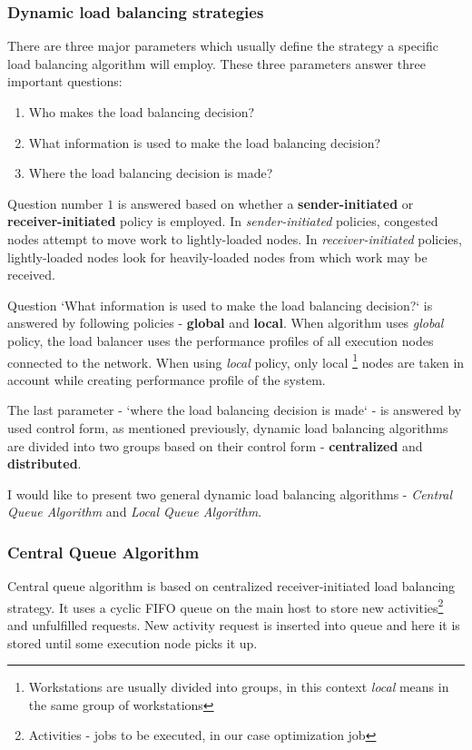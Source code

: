 \subsubsection{Dynamic load balancing strategies}
There are three major parameters which usually define the strategy a specific load balancing algorithm will employ.
These three parameters answer three important questions\cite{malik2000dynamic}:
\begin{enumerate}
    \item Who makes the load balancing decision?
    \item What information is used to make the load balancing decision?
    \item Where the load balancing decision is made?
\end{enumerate}

Question number $1$ is answered based on whether a \textbf{sender-initiated} or \textbf{receiver-initiated} policy is employed.
In \textit{sender-initiated} policies, congested nodes attempt to move work to lightly-loaded nodes.
In \textit{receiver-initiated} policies, lightly-loaded nodes look for heavily-loaded nodes from which work may be received\cite{malik2000dynamic}.

\smallskip
Question `What information is used to make the load balancing decision?` is answered by following policies - \textbf{global} and \textbf{local}.
When algorithm uses \textit{global} policy, the load balancer uses the performance profiles of all execution nodes connected to the network.
When using \textit{local} policy, only local
\footnote{Workstations are usually divided into groups, in this context \textit{local} means in the same group of workstations}
nodes are taken in account while creating performance profile of the system.

\smallskip
The last parameter - `where the load balancing decision is made` - is answered by used control form,
as mentioned previously,
dynamic load balancing algorithms are divided into two groups based on their control form - \textbf{centralized} and \textbf{distributed}.

\medskip
\noindent I would like to present two general dynamic load balancing algorithms - \textit{Central Queue Algorithm} and \textit{Local Queue Algorithm}.

\subsubsection{Central Queue Algorithm}
Central queue algorithm is based on centralized receiver-initiated load balancing strategy.
It uses a cyclic FIFO queue on the main host to store new activities\footnote{Activities - jobs to be executed, in our case optimization job}
and unfulfilled requests.
New activity request is inserted into queue and here it is stored until some execution node picks it up.

